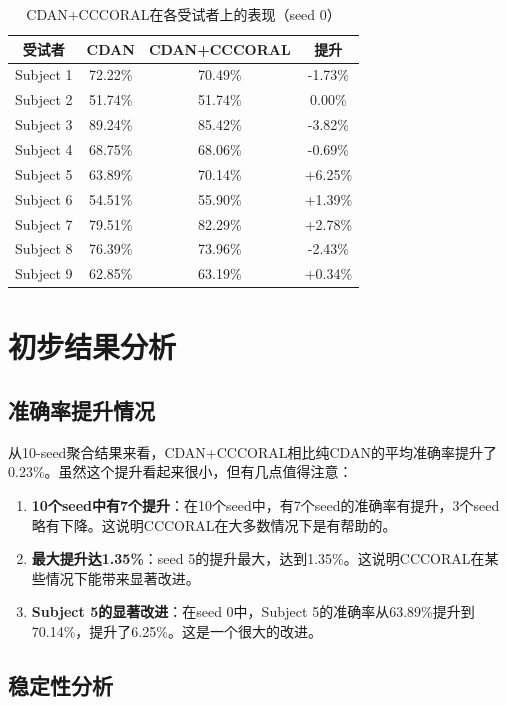 \documentclass[12pt,a4paper]{ctexart}
\begin{document}
\begin{table}[H]
\centering
\caption{CDAN+CCCORAL在各受试者上的表现（seed 0）}
\label{tab:subject_wise_cccoral}
\begin{tabular}{cccc}
\toprule
\textbf{受试者} & \textbf{CDAN} & \textbf{CDAN+CCCORAL} & \textbf{提升} \\
\midrule
Subject 1 & 72.22\% & 70.49\% & -1.73\% \\
Subject 2 & 51.74\% & 51.74\% & 0.00\% \\
Subject 3 & 89.24\% & 85.42\% & -3.82\% \\
Subject 4 & 68.75\% & 68.06\% & -0.69\% \\
Subject 5 & 63.89\% & 70.14\% & +6.25\% \\
Subject 6 & 54.51\% & 55.90\% & +1.39\% \\
Subject 7 & 79.51\% & 82.29\% & +2.78\% \\
Subject 8 & 76.39\% & 73.96\% & -2.43\% \\
Subject 9 & 62.85\% & 63.19\% & +0.34\% \\
\bottomrule
\end{tabular}
\end{table}

\section{初步结果分析}

\subsection{准确率提升情况}

从10-seed聚合结果来看，CDAN+CCCORAL相比纯CDAN的平均准确率提升了0.23\%。虽然这个提升看起来很小，但有几点值得注意：

\begin{enumerate}
    \item \textbf{10个seed中有7个提升}：在10个seed中，有7个seed的准确率有提升，3个seed略有下降。这说明CCCORAL在大多数情况下是有帮助的。
    
    \item \textbf{最大提升达1.35\%}：seed 5的提升最大，达到1.35\%。这说明CCCORAL在某些情况下能带来显著改进。
    
    \item \textbf{Subject 5的显著改进}：在seed 0中，Subject 5的准确率从63.89\%提升到70.14\%，提升了6.25\%。这是一个很大的改进。
\end{enumerate}

\subsection{稳定性分析}
\end{document}
